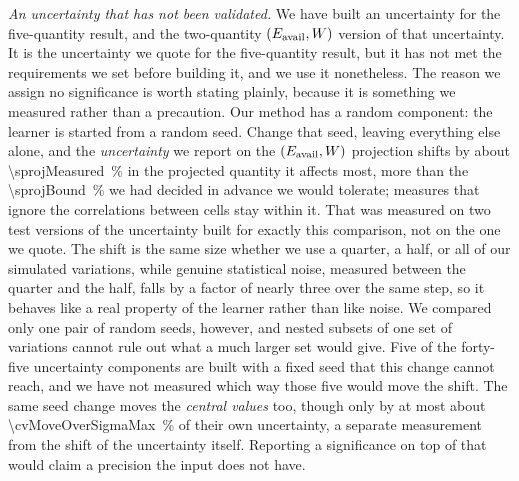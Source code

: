 \emph{An uncertainty that has not been validated.} We have built an uncertainty for the five-quantity result, and the two-quantity $(E_{\mathrm{avail}},W)$ version of that uncertainty. It is the uncertainty we quote for the five-quantity result, but it has not met the requirements we set before building it, and we use it nonetheless. The reason we assign no significance is worth stating plainly, because it is something we measured rather than a precaution. Our method has a random component: the learner is started from a random seed. Change that seed, leaving everything else alone, and the \emph{uncertainty} we report on the $(E_{\mathrm{avail}},W)$ projection shifts by about \SI[round-mode=places,round-precision=0]{\sprojMeasured}{\percent} in the projected quantity it affects most, more than the \SI{\sprojBound}{\percent} we had decided in advance we would tolerate; measures that ignore the correlations between cells stay within it. That was measured on two test versions of the uncertainty built for exactly this comparison, not on the one we quote. The shift is the same size whether we use a quarter, a half, or all of our simulated variations, while genuine statistical noise, measured between the quarter and the half, falls by a factor of nearly three over the same step, so it behaves like a real property of the learner rather than like noise. We compared only one pair of random seeds, however, and nested subsets of one set of variations cannot rule out what a much larger set would give. Five of the forty-five uncertainty components are built with a fixed seed that this change cannot reach, and we have not measured which way those five would move the shift. The same seed change moves the \emph{central values} too, though only by at most about \SI[round-mode=places,round-precision=0]{\cvMoveOverSigmaMax}{\percent} of their own uncertainty, a separate measurement from the shift of the uncertainty itself. Reporting a significance on top of that would claim a precision the input does not have.
